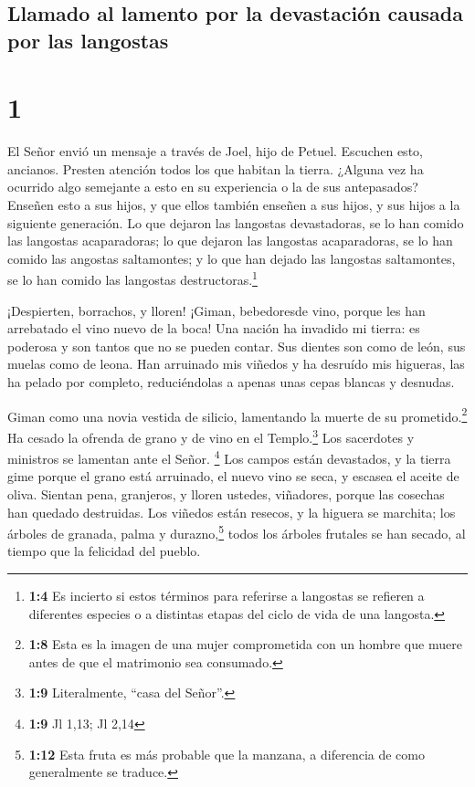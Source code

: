 \hypertarget{llamado-al-lamento-por-la-devastaciuxf3n-causada-por-las-langostas}{%
\subsection{Llamado al lamento por la devastación causada por las
langostas}\label{llamado-al-lamento-por-la-devastaciuxf3n-causada-por-las-langostas}}

\hypertarget{section}{%
\section{1}\label{section}}

 El Señor envió un mensaje a través de Joel, hijo de
Petuel.  Escuchen esto, ancianos. Presten atención todos
los que habitan la tierra. ¿Alguna vez ha ocurrido algo semejante a esto
en su experiencia o la de sus antepasados?  Enseñen esto a
sus hijos, y que ellos también enseñen a sus hijos, y sus hijos a la
siguiente generación.  Lo que dejaron las langostas
devastadoras, se lo han comido las langostas acaparadoras; lo que
dejaron las langostas acaparadoras, se lo han comido las angostas
saltamontes; y lo que han dejado las langostas saltamontes, se lo han
comido las langostas destructoras.\footnote{\textbf{1:4} Es incierto si
  estos términos para referirse a langostas se refieren a diferentes
  especies o a distintas etapas del ciclo de vida de una langosta.}

 ¡Despierten, borrachos, y lloren! ¡Giman, bebedoresde
vino, porque les han arrebatado el vino nuevo de la boca! 
Una nación ha invadido mi tierra: es poderosa y son tantos que no se
pueden contar. Sus dientes son como de león, sus muelas como de leona.
 Han arruinado mis viñedos y ha desruído mis higueras, las
ha pelado por completo, reduciéndolas a apenas unas cepas blancas y
desnudas.

 Giman como una novia vestida de silicio, lamentando la
muerte de su prometido.\footnote{\textbf{1:8} Esta es la imagen de una
  mujer comprometida con un hombre que muere antes de que el matrimonio
  sea consumado.}  Ha cesado la ofrenda de grano y de vino
en el Templo.\footnote{\textbf{1:9} Literalmente, ``casa del Señor''.}
Los sacerdotes y ministros se lamentan ante el Señor. \footnote{\textbf{1:9}
  Jl 1,13; Jl 2,14}  Los campos están devastados, y la
tierra gime porque el grano está arruinado, el nuevo vino se seca, y
escasea el aceite de oliva.  Sientan pena, granjeros, y
lloren ustedes, viñadores, porque las cosechas han quedado destruidas.
 Los viñedos están resecos, y la higuera se marchita; los
árboles de granada, palma y durazno,\footnote{\textbf{1:12} Esta fruta
  es más probable que la manzana, a diferencia de como generalmente se
  traduce.} todos los árboles frutales se han secado, al tiempo que la
felicidad del pueblo.

